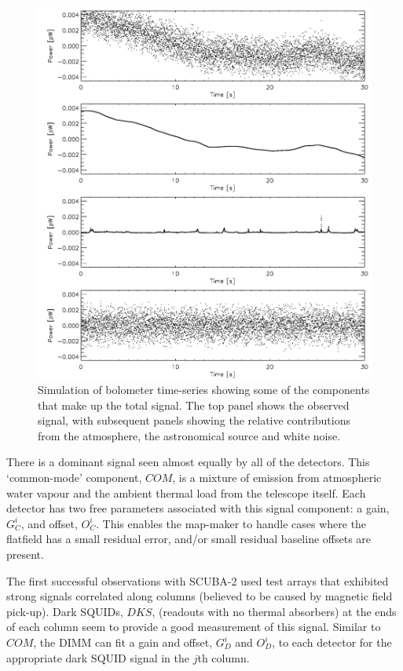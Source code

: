 \documentclass[twoside,11pt]{article}
\renewcommand{\_}{\texttt{\symbol{95}}}
\begin{document}
\begin{figure}[htb]
  \begin{center}
    \includegraphics[width=0.76\linewidth]{sun258_signalcpts}
    \caption{Simulation of bolometer time-series showing some of the
      components that make up the total signal. The top panel shows
      the observed signal, with subsequent panels showing the relative
      contributions from the atmosphere, the astronomical source and
      white noise.}
    \label{fig:comps}
  \end{center}
\end{figure}

There is a dominant signal seen almost equally by all of the
detectors. This `common-mode' component, $COM$, is a mixture of
emission from atmospheric water vapour and the ambient thermal load
from the telescope itself. Each detector has two free parameters
associated with this signal component: a gain, $G_C^i$, and offset,
$O_C^i$. This enables the map-maker to handle cases where the
flatfield has a small residual error, and/or small residual baseline
offsets are present.

The first successful observations with SCUBA-2 used test arrays that
exhibited strong signals correlated along columns (believed to be
caused by magnetic field pick-up). Dark SQUIDs, $DKS$, (readouts with
no thermal absorbers) at the ends of
each
column seem to provide
a good measurement of this signal. Similar to $COM$, the DIMM can fit
a gain and offset, $G_D^i$ and $O_D^i$, to each detector for the
appropriate dark SQUID signal in the $j$th column.
\end{document}
